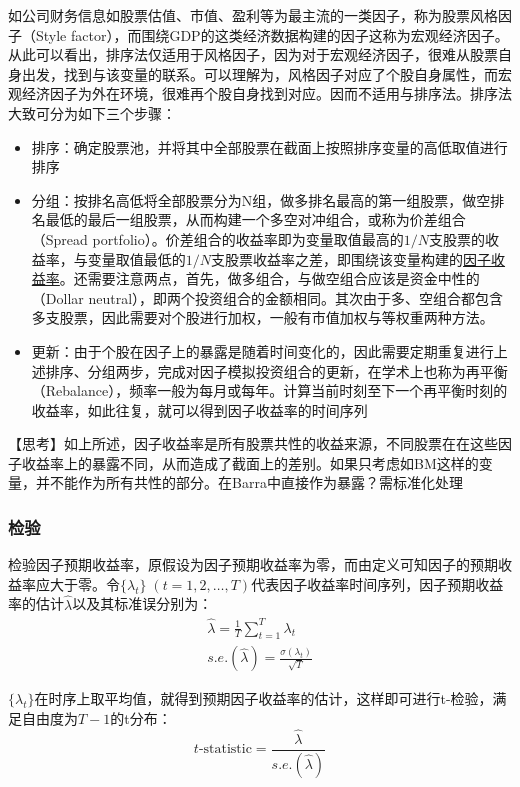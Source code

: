 \documentclass[11pt]{article}
\begin{document}
如公司财务信息如股票估值、市值、盈利等为最主流的一类因子，称为股票风格因子（Style factor），而围绕GDP的这类经济数据构建的因子这称为宏观经济因子。从此可以看出，排序法仅适用于风格因子，因为对于宏观经济因子，很难从股票自身出发，找到与该变量的联系。可以理解为，风格因子对应了个股自身属性，而宏观经济因子为外在环境，很难再个股自身找到对应。因而不适用与排序法。排序法大致可分为如下三个步骤：
\begin{itemize}
    \item 排序：确定股票池，并将其中全部股票在截面上按照排序变量的高低取值进行排序
    \item 分组：按排名高低将全部股票分为N组，做多排名最高的第一组股票，做空排名最低的最后一组股票，从而构建一个多空对冲组合，或称为价差组合（Spread portfolio）。价差组合的收益率即为变量取值最高的$1/N$支股票的收益率，与变量取值最低的$1/N$支股票收益率之差，即围绕该变量构建的\uline{因子收益率}。还需要注意两点，首先，做多组合，与做空组合应该是资金中性的（Dollar neutral），即两个投资组合的金额相同。其次由于多、空组合都包含多支股票，因此需要对个股进行加权，一般有市值加权与等权重两种方法。
    \item 更新：由于个股在因子上的暴露是随着时间变化的，因此需要定期重复进行上述排序、分组两步，完成对因子模拟投资组合的更新，在学术上也称为再平衡（Rebalance），频率一般为每月或每年。计算当前时刻至下一个再平衡时刻的收益率，如此往复，就可以得到因子收益率的时间序列
\end{itemize}

【思考】如上所述，因子收益率是所有股票共性的收益来源，不同股票在在这些因子收益率上的暴露不同，从而造成了截面上的差别。如果只考虑如BM这样的变量，并不能作为所有共性的部分。在Barra中直接作为暴露？需标准化处理

\subsubsection{检验}

检验因子预期收益率，原假设为因子预期收益率为零，而由定义可知因子的预期收益率应大于零。令$\{\lambda_t\} \; (t=1,2,\dots,T)$代表因子收益率时间序列，因子预期收益率的估计$\hat{\lambda}$以及其标准误分别为：
\begin{gather*}
    \hat{\lambda} = \frac{1}{T}\sum_{t=1}^{T} \lambda_t \\
    s.e.(\hat{\lambda}) = \frac{\sigma(\lambda_t)}{\sqrt{T}}
\end{gather*}

$\{\lambda_t\}$在时序上取平均值，就得到预期因子收益率的估计，这样即可进行t-检验，满足自由度为$T-1$的t分布：
\begin{equation*}
    t\text{-statistic} = \frac{\hat{\lambda}}{s.e.(\hat{\lambda})}
\end{equation*}
\end{document}
